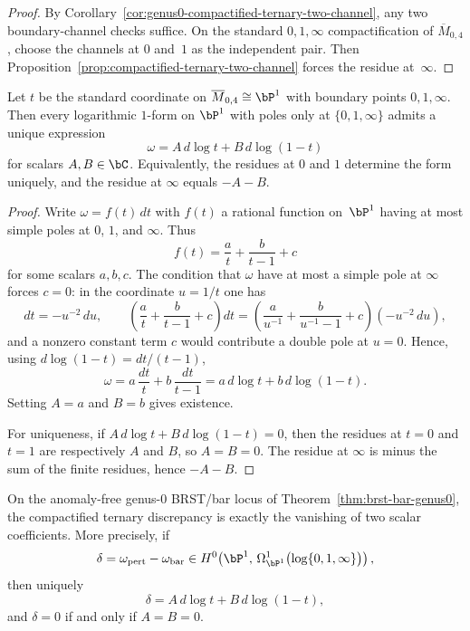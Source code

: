 \begin{proof}
By Corollary~\ref{cor:genus0-compactified-ternary-two-channel}, any two
boundary-channel checks suffice. On the standard
$0,1,\infty$ compactification of $\overline{M}_{0,4}$, choose
the channels at $0$ and~$1$ as the independent pair. Then
Proposition~\ref{prop:compactified-ternary-two-channel} forces the
residue at~$\infty$.
\end{proof}

\begin{proposition}
\label{prop:m04-standard-log-basis}
Let $t$ be the standard coordinate on
$\overline{M}_{0,4} \cong \bP^1$ with boundary points
$0,1,\infty$. Then every logarithmic $1$-form on
$\bP^1$ with poles only at $\{0,1,\infty\}$ admits a unique
expression
\[
\omega = A\, d\log t + B\, d\log(1-t)
\]
for scalars $A,B \in \bC$.
Equivalently, the residues at $0$ and $1$ determine the form
uniquely, and the residue at $\infty$ equals $-A-B$.
\end{proposition}

\begin{proof}
Write $\omega = f(t)\,dt$ with $f(t)$ a rational function on~$\bP^1$
having at most simple poles at $0$, $1$, and $\infty$.
Thus
\[
f(t)=\frac{a}{t}+\frac{b}{t-1}+c
\]
for some scalars $a,b,c$. The condition that $\omega$ have at most a
simple pole at $\infty$ forces $c=0$: in the coordinate $u=1/t$ one
has
\[
dt = -u^{-2}\,du,\qquad
\left(\frac{a}{t}+\frac{b}{t-1}+c\right)dt
= \left(\frac{a}{u^{-1}}+\frac{b}{u^{-1}-1}+c\right)(-u^{-2}\,du),
\]
and a nonzero constant term $c$ would contribute a double pole at
$u=0$.
Hence, using $d\log(1-t) = dt/(t-1)$,
\[
\omega = a\,\frac{dt}{t}+b\,\frac{dt}{t-1}
= a\, d\log t + b\, d\log(1-t).
\]
Setting $A=a$ and $B=b$ gives existence.

For uniqueness, if
$A\, d\log t + B\, d\log(1-t)=0$, then the residues at
$t=0$ and $t=1$ are respectively $A$ and $B$, so $A=B=0$.
The residue at $\infty$ is minus the sum of the finite residues, hence
$-A-B$.
\end{proof}

\begin{corollary}
\label{cor:genus0-two-coefficient-discrepancy}
On the anomaly-free genus-$0$ BRST/bar locus of
Theorem~\ref{thm:brst-bar-genus0}, the compactified ternary discrepancy
is exactly the vanishing of two scalar coefficients. More precisely, if
\[
\delta = \omega_{\mathrm{pert}} - \omega_{\mathrm{bar}}
\in H^0\!\left(\bP^1,\,
\Omega^1_{\bP^1}\bigl(\log\{0,1,\infty\}\bigr)\right),
\]
then uniquely
\[
\delta = A\, d\log t + B\, d\log(1-t),
\]
and \(\delta=0\) if and only if \(A=B=0\).
\end{corollary}

